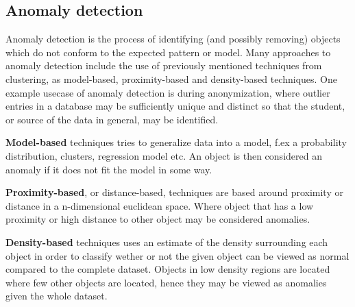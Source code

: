 \subsection{Anomaly detection}
	Anomaly detection is the process of identifying (and possibly removing) objects which do not conform to the expected pattern or model. 
	Many approaches to anomaly detection include the use of 
	previously mentioned techniques from clustering, as model-based, proximity-based and density-based techniques. 
	One example usecase of anomaly detection is during anonymization, 
	where outlier entries in a database may be sufficiently unique and distinct so that the student, or source of the data in general, may be identified. 
	
	\bigskip\noindent
	\textbf{Model-based} techniques tries to generalize data into a model, 
	f.ex a probability distribution, clusters, regression model etc. 
	An object is then considered an anomaly if it does not fit the model in some way. 
	
	\bigskip\noindent
	\textbf{Proximity-based}, or distance-based, techniques are based around proximity or distance in a n-dimensional euclidean space. 
	Where object that has a low proximity or high distance to other object may be considered anomalies.
	
	\bigskip\noindent
	\textbf{Density-based} techniques uses an estimate of the density surrounding each object in order to classify wether or not the given object can be viewed as normal compared to the complete dataset. Objects in low density regions are located where few other objects are located, hence they may be viewed as anomalies given the whole dataset.
	
